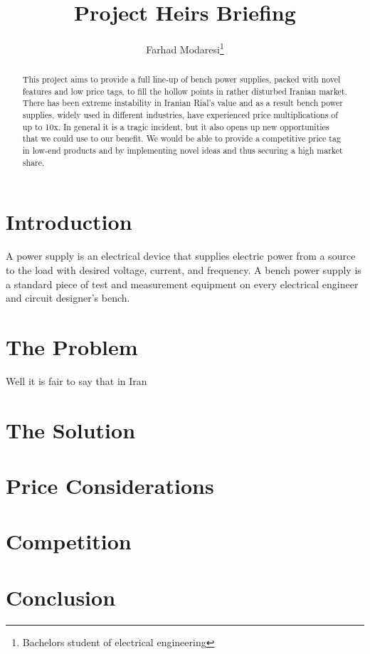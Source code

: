 \documentclass[a4paper, twocolumn]{article}
\title{
	\LARGE{
		\textbf{
			Project Heirs Briefing
		}
	}
}
\author{
	Farhad Modaresi\footnote{Bachelors student of electrical engineering}
}
\begin{document}
\maketitle


\begin{abstract}
	This project aims to provide a full line-up of bench power supplies, packed with novel features and low price tags, to fill the hollow points in rather disturbed Iranian market. There has been extreme instability in Iranian Rial's value and as a result bench power supplies, widely used in different industries, have experienced price multiplications of up to 10x. In general it is a tragic incident, but it also opens up new opportunities that we could use to our benefit. We would be able to provide a competitive price tag in low-end products and by implementing novel ideas and thus securing a high market share. 
\end{abstract}
\section*{Introduction}
A power supply is an electrical device that supplies electric power from a source to the load with desired voltage, current, and frequency. A bench power supply is a standard piece of test and measurement equipment on every electrical engineer and circuit designer’s bench.  
\section*{The Problem}
Well it is fair to say that in Iran 
\section*{The Solution}
\section*{Price Considerations}
\section*{Competition}
\section*{Conclusion}
\end{document}
